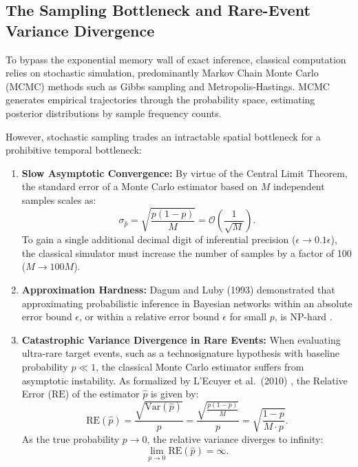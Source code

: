 \subsection{The Sampling Bottleneck and Rare-Event Variance Divergence}
To bypass the exponential memory wall of exact inference, classical computation relies on stochastic simulation, predominantly Markov Chain Monte Carlo (MCMC) methods such as Gibbs sampling and Metropolis-Hastings. MCMC generates empirical trajectories through the probability space, estimating posterior distributions by sample frequency counts.

However, stochastic sampling trades an intractable spatial bottleneck for a prohibitive temporal bottleneck:
\begin{enumerate}
    \item \textbf{Slow Asymptotic Convergence:} By virtue of the Central Limit Theorem, the standard error of a Monte Carlo estimator based on $M$ independent samples scales as:
    \begin{equation}
    \sigma_{\hat{p}} = \sqrt{\frac{p(1-p)}{M}} = \mathcal{O}\left(\frac{1}{\sqrt{M}}\right).
    \label{eq:mcmc_convergence_ch1}
    \end{equation}
    To gain a single additional decimal digit of inferential precision ($\epsilon \to 0.1\epsilon$), the classical simulator must increase the number of samples by a factor of 100 ($M \to 100M$).
    \item \textbf{Approximation Hardness:} Dagum and Luby (1993) demonstrated that approximating probabilistic inference in Bayesian networks within an absolute error bound $\epsilon$, or within a relative error bound $\epsilon$ for small $p$, is NP-hard \cite{dagum1993}.
    \item \textbf{Catastrophic Variance Divergence in Rare Events:} When evaluating ultra-rare target events, such as a technosignature hypothesis with baseline probability $p \ll 1$, the classical Monte Carlo estimator suffers from asymptotic instability. As formalized by L'Ecuyer et al.~(2010) \cite{lecuyer2010}, the Relative Error ($\mathrm{RE}$) of the estimator $\hat{p}$ is given by:
    \begin{equation}
    \mathrm{RE}(\hat{p}) = \frac{\sqrt{\mathrm{Var}(\hat{p})}}{p} = \frac{\sqrt{\frac{p(1-p)}{M}}}{p} = \sqrt{\frac{1-p}{M \cdot p}}.
    \label{eq:relative_error_divergence_ch1}
    \end{equation}
    As the true probability $p \to 0$, the relative variance diverges to infinity:
    \begin{equation}
    \lim_{p \to 0} \mathrm{RE}(\hat{p}) = \infty.
    \end{equation}
\end{enumerate}

